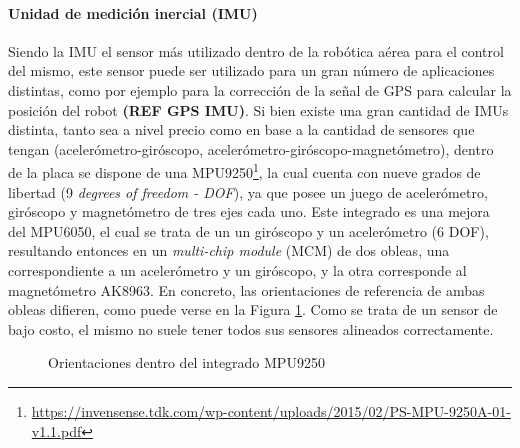 \paragraph{Unidad de medición inercial (IMU)}
Siendo la IMU el sensor más utilizado dentro de la robótica aérea para el control del mismo, este sensor puede ser utilizado para un gran número de aplicaciones distintas, como por ejemplo para la corrección de la señal de GPS para calcular la posición del robot \textbf{(REF GPS IMU)}. Si bien existe una gran cantidad de IMUs distinta, tanto sea a nivel precio como en base a la cantidad de sensores que tengan (acelerómetro-giróscopo, acelerómetro-giróscopo-magnetómetro), dentro de la placa se dispone de una MPU9250\footnote{\url{https://invensense.tdk.com/wp-content/uploads/2015/02/PS-MPU-9250A-01-v1.1.pdf}}, la cual cuenta con nueve grados de libertad (9 \textit{degrees of freedom - DOF}), ya que posee un juego de acelerómetro, giróscopo y magnetómetro de tres ejes cada uno. Este integrado es una mejora del MPU6050, el cual se trata de un un giróscopo y un acelerómetro (6 DOF), resultando entonces en un \textit{multi-chip module} (MCM) de dos obleas, una correspondiente a un acelerómetro y un giróscopo, y la otra corresponde al magnetómetro AK8963. En concreto, las orientaciones de referencia de ambas obleas difieren, como puede verse en la Figura \ref{fig:mpu9250orientations}. Como se trata de un sensor de bajo costo, el mismo no suele tener todos sus sensores alineados correctamente.
\begin{figure}
    \centering
    \qquad
    \caption{Orientaciones dentro del integrado MPU9250}
    \label{fig:mpu9250orientations}
\end{figure}

